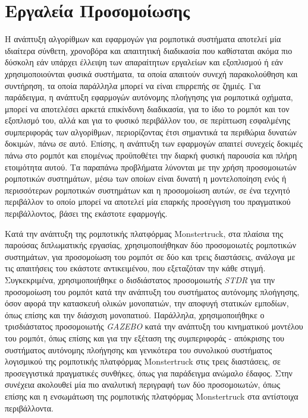 \section{Εργαλεία Προσομοίωσης} \label{sec:simulation_tools}
Η ανάπτυξη αλγορίθμων και εφαρμογών για ρομποτικά συστήματα αποτελεί μία ιδιαίτερα σύνθετη, χρονοβόρα και απαιτητική διαδικασία που καθίσταται ακόμα πιο δύσκολη εάν υπάρχει έλλειψη των απαραίτητων εργαλείων και εξοπλισμού ή εάν χρησιμοποιούνται φυσικά συστήματα, τα οποία απαιτούν συνεχή παρακολούθηση και συντήρηση, τα οποία παράλληλα μπορεί να είναι επιρρεπής σε ζημιές. Για παράδειγμα, η ανάπτυξη εφαρμογών αυτόνομης πλοήγησης για ρομποτικά οχήματα, μπορεί να αποτελέσει αρκετά επικίνδυνη διαδικασία, για το ίδιο το ρομπότ και τον εξοπλισμό του, αλλά και για το φυσικό περιβάλλον του, σε περίπτωση εσφαλμένης συμπεριφοράς των αλγορίθμων, περιορίζοντας έτσι σημαντικά τα περιθώρια δυνατών δοκιμών, πάνω σε αυτό. Επίσης, η ανάπτυξη των εφαρμογών απαιτεί συνεχείς δοκιμές πάνω στο ρομπότ και επομένως προϋποθέτει την διαρκή φυσική παρουσία και πλήρη ετοιμότητα αυτού. Τα παραπάνω προβλήματα λύνονται με την χρήση προσομοιωτών ρομποτικών συστημάτων, μέσω των οποίων είναι δυνατή η μοντελοποίηση ενός ή περισσότερων ρομποτικών συστημάτων και η προσομοίωση αυτών, σε ένα τεχνητό περιβάλλον το οποίο μπορεί να αποτελεί μία επαρκής προσέγγιση του πραγματικού περιβάλλοντος, βάσει της εκάστοτε εφαρμογής.

\bigskip
Κατά την ανάπτυξη της ρομποτικής πλατφόρμας Monstertruck, στα πλαίσια της παρούσας διπλωματικής εργασίας, χρησιμοποιήθηκαν δύο προσομοιωτές ρομποτικών συστημάτων, για προσομοίωση του ρομπότ σε δύο και τρεις διαστάσεις, ανάλογα με τις απαιτήσεις του εκάστοτε αντικειμένου, που εξεταζόταν την κάθε στιγμή. Συγκεκριμένα, χρησιμοποιήθηκε ο δισδιάστατος προσομοιωτής \textit{STDR} \cite{stdr} για την προσομοίωση του ρομπότ κατά την ανάπτυξη του συστήματος αυτόνομης πλοήγησης, όσον αφορά την κατασκευή ολικών μονοπατιών, την αποφυγή στατικών εμποδίων, όπως επίσης και την διάσχιση μονοπατιού. Παράλληλα, χρησιμοποιήθηκε ο τρισδιάστατος προσομοιωτής \textit{GAZEBO} \cite{gazebo} κατά την ανάπτυξη του κινηματικού μοντέλου του ρομπότ, όπως επίσης και για την εξέταση της συμπεριφοράς - απόκρισης του συστήματος αυτόνομης πλοήγησης και γενικότερα του συνολικού συστήματος λογισμικού της ρομποτικής πλατφόρμας Monstertruck στις τρεις διαστάσεις, σε προσεγγιστικά πραγματικές συνθήκες, όπως για παράδειγμα ανώμαλο έδαφος. Στην συνέχεια ακολουθεί μία πιο αναλυτική περιγραφή των δύο προσομοιωτών, όπως επίσης και η ενσωμάτωση της ρομποτικής πλατφόρμας Monstertruck στα αντίστοιχα περιβάλλοντα.

